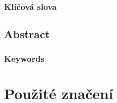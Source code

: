 \subsection*{Klíčová slova}
\KlicovaSlova
\thispagestyle{empty}

\vfill


\section*{Abstract}
\Abstract

\subsection*{Keywords}
\Keywords
\thispagestyle{empty}

\newpage

\tableofcontents
\thispagestyle{empty}

\newpage

\listoffigures

\newpage

\listoftables

\newpage

\chapter*{Použité značení}
\Zktratky

\newpage


